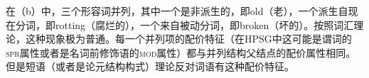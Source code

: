 \noindent
在（b）中，三个形容词并列，其中一个是非派生的，即old（老），一个派生自现在分词，即rotting（腐烂的），一个来自被动分词，即broken（坏的）。按照词汇理论，这种现象极为普通。每一个\azeroc 并列项的配价特征（在HPSG中这可能是谓词的\textsc{spr}属性或者是名词前修饰语的\textsc{mod}属性）都与并列结构父结点的配价属性相同。但是短语（或者是论元结构构式）理论反对词语有这种配价特征。




